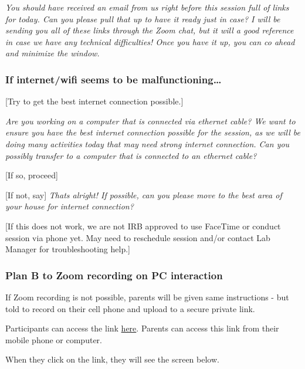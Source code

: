 \documentclass[]{book}
\begin{document}
\emph{You should have received an email from us right before this session full of links for today. Can you please pull that up to have it ready just in case? I will be sending you all of these links through the Zoom chat, but it will a good reference in case we have any technical difficulties! Once you have it up, you can co ahead and minimize the window.}

\hypertarget{if-internetwifi-seems-to-be-malfunctioning}{%
\subsubsection{If internet/wifi seems to be malfunctioning\ldots{}}\label{if-internetwifi-seems-to-be-malfunctioning}}

{[}Try to get the best internet connection possible.{]}

\emph{Are you working on a computer that is connected via ethernet cable? We want to ensure you have the best internet connection possible for the session, as we will be doing many activities today that may need strong internet connection. Can you possibly transfer to a computer that is connected to an ethernet cable?}

{[}If so, proceed{]}

{[}If not, say{]} \emph{Thats alright! If possible, can you please move to the best area of your house for internet connection?}

{[}If this does not work, we are not IRB approved to use FaceTime or conduct session via phone yet. May need to reschedule session and/or contact Lab Manager for troubleshooting help.{]}

\hypertarget{plan-b-to-zoom-recording-on-pc-interaction-1}{%
\subsubsection{Plan B to Zoom recording on PC interaction}\label{plan-b-to-zoom-recording-on-pc-interaction-1}}

If Zoom recording is not possible, parents will be given same instructions - but told to record on their cell phone and upload to a secure private link.

Participants can access the link \href{https://ucla.app.box.com/f/3c52df2afb1a446ab363b793f8af22c1}{here}. Parents can access this link from their mobile phone or computer.

When they click on the link, they will see the screen below.
\end{document}

